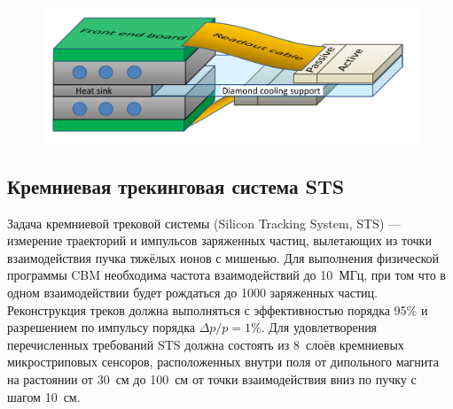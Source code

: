\begin{figure}[H]
\includegraphics[width=1.0\textwidth]{pictures/MVD_3.png}
\caption{}
\label{fig:MVD3}
\end{figure}


\subsection{Кремниевая трекинговая система STS}\label{sec:secSTS}


Задача кремниевой трековой системы (Silicon Tracking System, STS) --- измерение траекторий и импульсов заряженных частиц, вылетающих из точки взаимодействия пучка тяжёлых ионов с мишенью. Для выполнения физической программы CBM необходима частота взаимодействий до 10~МГц, при том что в одном взаимодействии будет рождаться до 1000 заряженных частиц. Реконструкция треков должна выполняться с эффективностью порядка 95\% и разрешением по импульсу порядка $\Delta p / p = 1\%$. Для удовлетворения перечисленных требований STS должна состоять из 8~слоёв кремниевых микростриповых сенсоров, расположенных внутри поля от дипольного магнита на растоянии от 30~см до 100~см от точки взаимодействия вниз по пучку с шагом 10~см.


